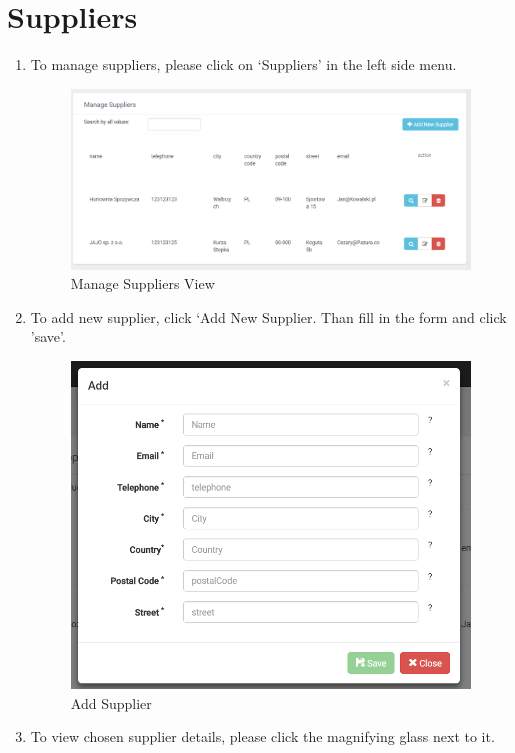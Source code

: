 \documentclass[a4paper,11pt,twoside]{report}
\theoremstyle{definition}
\begin{document}
\section{Suppliers}
\begin{enumerate}
\item To manage suppliers, please click on ‘Suppliers’ in the left side menu. 

\begin{figure}[h!]
\begin{center}
\includegraphics[width=\textwidth]{AS/supplier/1}
\end{center}
\caption{Manage Suppliers View}
\end{figure}
\thispagestyle{empty}

\item To add new supplier, click ‘Add New Supplier. Than fill in the form and click 'save'.

\begin{figure}[h!]
\begin{center}
\includegraphics[width=\textwidth]{AS/supplier/2}
\end{center}
\caption{Add Supplier}
\end{figure}
\thispagestyle{empty}
\item To view chosen supplier details, please click the magnifying glass next to it.


\end{enumerate}
\end{document}
